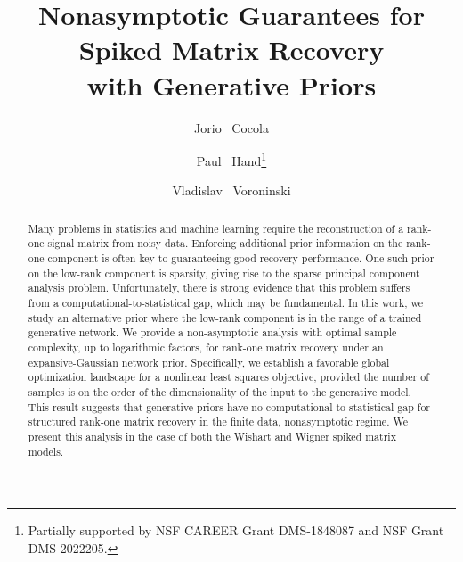 \documentclass[11pt]{article}
\title{Nonasymptotic Guarantees for Spiked Matrix Recovery \\with Generative Priors}
\author[1]{Jorio ~Cocola}
\author[1,2]{Paul ~Hand\thanks{Partially supported by NSF CAREER Grant DMS-1848087 and NSF Grant DMS-2022205.}}
\author[3]{Vladislav ~Voroninski}
\affil[1]{Department of Mathematics, Northeastern University}
\affil[2]{Khoury College of Computer Sciences, Northeastern University}
\affil[3]{Helm.ai}
\begin{document}
\maketitle

\begin{abstract}
Many problems in statistics and machine learning require the reconstruction of a rank-one signal matrix from noisy data. Enforcing additional prior information on the rank-one component is often key to guaranteeing good recovery performance. One such prior on the low-rank component is sparsity, giving rise to the sparse principal component analysis problem. Unfortunately, there is strong evidence that this problem suffers from a computational-to-statistical gap, which may be fundamental. In this work, we study an alternative prior where the low-rank component is in the range of a trained generative network. We provide a non-asymptotic analysis with optimal sample complexity, up to logarithmic factors, for rank-one matrix recovery under an expansive-Gaussian network prior. Specifically, we establish a favorable global optimization landscape for a nonlinear least squares objective, provided the number of samples is on the order of the dimensionality of the input to the generative model. This result suggests that generative priors have no computational-to-statistical gap for structured rank-one matrix recovery in the finite data, nonasymptotic regime. We present this analysis in the case of both the Wishart and Wigner spiked matrix models.
\end{abstract}










\newpage
\appendix





\end{document}
